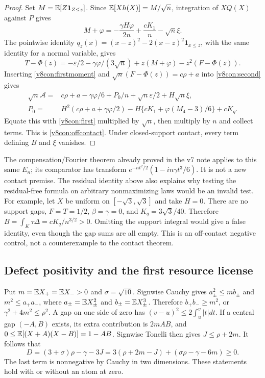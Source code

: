 \begin{proof}
Set $M=\mathbb E[Z\mathbf1_{Z\le z}]$. Since
$\mathbb E[Xh(X)]=M/\sqrt n$, integration of $XQ(X)$ against $P$ gives
\begin{equation}\label{v8con:firstmoment}
 M+\varphi=-\frac{\gamma H\varphi}{2n}+\frac{cK_1}{n}-\sqrt n\xi.
\end{equation}
The pointwise identity
$q_z(x)=(x-z)^2-2(x-z)^2\mathbf1_{x\le z}$, with the same identity
for a normal variable, gives
\[
 T-\Phi(z)=-\varepsilon/2-\gamma\varphi/(3\sqrt n)
              +z(M+\varphi)-z^2(F-\Phi(z)).
\]
Inserting \eqref{v8con:firstmoment} and
$\sqrt n(F-\Phi(z))=c\rho+a$ into \eqref{v8con:second} gives
\begin{align*}
 \sqrt n\mathcal A={}&c\rho+a-\gamma\varphi/6+P_0/n
                    +\sqrt n\varepsilon/2+H\sqrt n\xi,\\
 P_0={}&H^2(c\rho+a+\gamma\varphi/2)
       -H\{cK_1+\varphi(M_4-3)/6\}+cK_q.
\end{align*}
Equate this with \eqref{v8con:first} multiplied by $\sqrt n$,
then multiply by $n$ and collect terms. This is
\eqref{v8con:offcontact}. Under closed-support contact, every
term defining $B$ and $\xi$ vanishes.
\end{proof}

The compensation/Fourier theorem already proved in the v7 note applies
to this same $E_n$; its comparator has transform
$e^{-nt^2/2}(1-in\gamma t^3/6)$. It is not a new contact premise.
The residual identity above also explains why testing the residual-free
formula on arbitrary nonmaximizing laws would be an invalid test.
For example, let $X$ be uniform on $[-\sqrt3,\sqrt3]$ and take
$H=0$. There are no support gaps, $F=T=1/2$, $\beta=\gamma=0$,
and $K_q=3\sqrt3/40$. Therefore
$B=\int_K\tau\Delta=cK_q/n^{3/2}>0$.
Omitting the support integral would give a false identity, even though
the gap sums are all empty. This is an off-contact negative control,
not a counterexample to the contact theorem.

\subsection{Defect positivity and the first resource license}

Put $m=\mathbb E X_+=\mathbb E X_->0$ and $\sigma=\sqrt{10}$.
Signwise Cauchy gives $a_\pm^2\le mb_\pm$ and
$m^2\le a_+a_-$, where $a_\pm=\mathbb E X_\pm^2$ and
$b_\pm=\mathbb E X_\pm^3$. Therefore $b_+b_-\ge m^2$, or
$\gamma^2+4m^2\le\rho^2$. A gap on one side of zero has
$(v-u)^2\le2\int_u^v|t|dt$. If a central gap $(-A,B)$ exists,
its extra contribution is $2mAB$, and
$0\le\mathbb E[(X+A)(X-B)]=1-AB$. Signwise Tonelli then gives
$J\le\rho+2m$. It follows that
\begin{equation}\label{v8con:defect}
 D=(3+\sigma)\rho-\gamma-3J
 =3(\rho+2m-J)+(\sigma\rho-\gamma-6m)\ge0.
\end{equation}
The last term is nonnegative by Cauchy in two dimensions.
These statements hold with or without an atom at zero.

